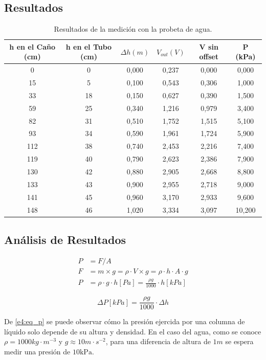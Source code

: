 \subsection{Resultados}
\begin{table}[ht]
\begin{center}
\begin{tabular}{||c|c|c|c|c|c||}
\hline
h en el Caño (cm) &h en el Tubo (cm)&$\Delta h (m)$&$V_{out} (V)$& V sin offset & P (kPa)\\
\hline
0&0&0,000&0,237&0,000&0,000\\
15&5&0,100&0,543&0,306&1,000\\
33&18&0,150&0,627&0,390&1,500\\
59&25&0,340&1,216&0,979&3,400\\
82&31&0,510&1,752&1,515&5,100\\
93&34&0,590&1,961&1,724&5,900\\
112&38&0,740&2,453&2,216&7,400\\
119&40&0,790&2,623&2,386&7,900\\
130&42&0,880&2,905&2,668&8,800\\
133&43&0,900&2,955&2,718&9,000\\
141&45&0,960&3,170&2,933&9,600\\
148&46&1,020&3,334&3,097&10,200\\
\hline
\end{tabular}
\caption{Resultados de la medición con la probeta de agua.}
\end{center}
\end{table}

\subsection{Análisis de Resultados}

\begin{align*}
P &= F/A \\
F &= m \times g = \rho \cdot V \times g = \rho \cdot h \cdot A \cdot g\\
P &= \rho \cdot g \cdot h [Pa] = \frac{\rho g}{1000}\cdot h [kPa]
\end{align*}

\begin{equation}
\Delta P [kPa]= \frac{\rho g}{1000}\cdot \Delta h
\label{e4:eq_p}
\end{equation}

De \eqref{e4:eq_p} se puede observar cómo la presión ejercida por una columna de líquido solo depende de su altura y densidad. En el caso del agua, como se conoce $\rho = 1000 kg \cdot m^{-3}$ y $g \approx 10 m\cdot s^{-2}$, para una diferencia de altura de $1 m$ se espera medir una presión de $10 \si{\kilo\pascal}$.

